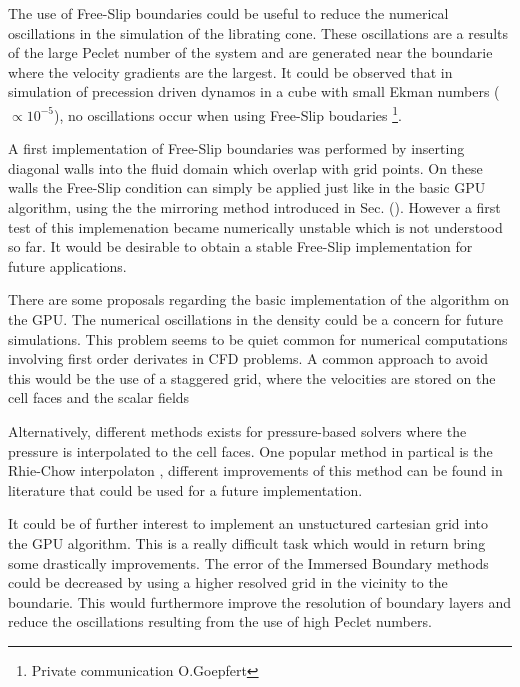 The use of Free-Slip boundaries could be useful to reduce the numerical oscillations in the simulation of the librating cone.
These oscillations are a results of the large Peclet number of the system and are generated
near the boundarie where the velocity gradients are the largest.
It could be observed that in simulation of precession driven dynamos in a cube with small Ekman numbers ($\propto 10^{-5}$),
no oscillations occur when using Free-Slip boudaries \footnote{Private communication O.Goepfert}.

A first implementation of Free-Slip boundaries was performed
by inserting diagonal walls into the fluid domain which overlap with grid points.
On these walls the Free-Slip condition can simply be applied just like in the basic GPU algorithm,
using the the mirroring method introduced in Sec. ().
However a first test of this implemenation became numerically unstable which is not understood so far.
It would be desirable to obtain a stable  Free-Slip implementation for future applications.


There are some proposals regarding the basic implementation of the algorithm on the GPU.
The numerical oscillations in the density could be a concern for future simulations.
This problem seems to be quiet common for numerical computations involving first order derivates in CFD problems.
A common approach to avoid this would be the use of a staggered grid, where the velocities
are stored on the cell faces and the scalar fields

Alternatively, different methods exists for pressure-based solvers where the pressure is interpolated to the cell faces.
One popular method in partical is the Rhie-Chow interpolaton \citep{uiae},
different improvements of this method can be found in literature \citep{uiae} that could be used for a future implementation.

It could be of further interest to implement an unstuctured cartesian grid into the GPU algorithm.
This is a really difficult task which would in return bring some drastically improvements.
The error of the Immersed Boundary methods could be decreased by using a higher resolved grid in the vicinity to the boundarie.
This would furthermore  improve the resolution of boundary layers  and reduce the oscillations resulting from the use of high Peclet numbers.


